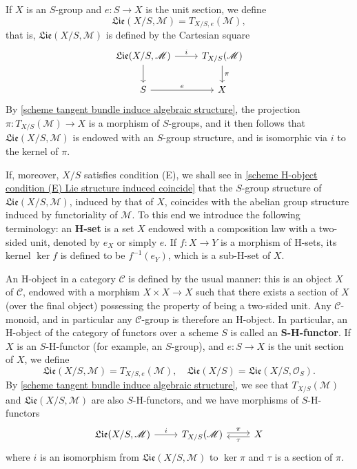 If $X$ is an $S$-group and $e:S\to X$ is the unit section, we define
\[\mathfrak{Lie}(X/S,\mathscr{M})=T_{X/S,e}(\mathscr{M}),\]
that is, $\mathfrak{Lie}(X/S,\mathscr{M})$ is defined by the Cartesian square
\[\begin{tikzcd}
\mathfrak{Lie}(X/S,\mathscr{M})\ar[d]\ar[r,"i"]&T_{X/S}(\mathscr{M})\ar[d,"\pi"]\\
S\ar[r,"e"]&X
\end{tikzcd}\]
By \cref{scheme tangent bundle induce algebraic structure}, the projection $\pi:T_{X/S}(\mathscr{M})\to X$ is a morphism of $S$-groups, and it then follows that $\mathfrak{Lie}(X/S,\mathscr{M})$ is endowed with an $S$-group structure, and is isomorphic via $i$ to the kernel of $\pi$.\par
If, moreover, $X/S$ satisfies condition (E), we shall see in \cref{scheme H-object condition (E) Lie structure induced coincide} that the $S$-group structure of $\mathfrak{Lie}(X/S,\mathscr{M})$, induced by that of $X$, coincides with the abelian group structure induced by functoriality of $\mathscr{M}$. To this end we introduce the following terminology: an \textbf{H-set} is a set $X$ endowed with a composition law with a two-sided unit, denoted by $e_X$ or simply $e$. If $f:X\to Y$ is a morphism of H-sets, its kernel $\ker f$ is defined to be $f^{-1}(e_Y)$, which is a sub-H-set of $X$.\par
An H-object in a category $\mathcal{C}$ is defined by the usual manner: this is an object $X$ of $\mathcal{C}$, endowed with a morphism $X\times X\to X$ such that there exists a section of $X$ (over the final object) possessing the property of being a two-sided unit. Any $\mathcal{C}$-monoid, and in particular any $\mathcal{C}$-group is therefore an H-object. In particular, an H-object of the category of functors over a scheme $S$ is called an \textbf{$\bm{S}$-H-functor}. If $X$ is an $S$-H-functor (for example, an $S$-group), and $e:S\to X$ is the unit section of $X$, we define
\[\mathfrak{Lie}(X/S,\mathscr{M})=T_{X/S,e}(\mathscr{M}),\quad \mathfrak{Lie}(X/S)=\mathfrak{Lie}(X/S,\mathscr{O}_S).\]
By \cref{scheme tangent bundle induce algebraic structure}, we see that $T_{X/S}(\mathscr{M})$ and $\mathfrak{Lie}(X/S,\mathscr{M})$ are also $S$-H-functors, and we have morphisms of $S$-H-functors
\begin{equation}\label{scheme H-object Lie exact sequence}
\begin{tikzcd}
\mathfrak{Lie}(X/S,\mathscr{M})\ar[r,"i"]&T_{X/S}(\mathscr{M})\ar[r,shift left=2pt,"\pi"]&X\ar[l,shift left=2pt,"\tau"]
\end{tikzcd}
\end{equation}
where $i$ is an isomorphism from $\mathfrak{Lie}(X/S,\mathscr{M})$ to $\ker\pi$ and $\tau$ is a section of $\pi$.


